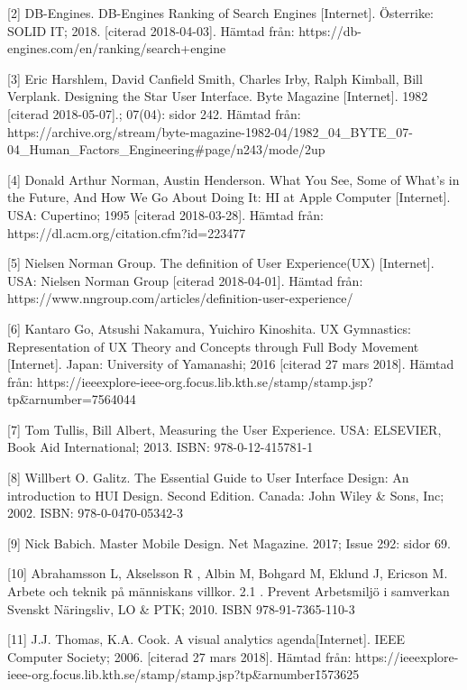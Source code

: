 \documentclass[12pt]{kththesis}
\begin{document}
[2] DB-Engines. DB-Engines Ranking of Search Engines [Internet]. Österrike: SOLID IT; 2018. [citerad 2018-04-03]. Hämtad från:\newline  
https://db-engines.com/en/ranking/search+engine  

[3] Eric Harshlem, David Canfield Smith, Charles Irby, Ralph Kimball, Bill Verplank. Designing the Star User Interface. Byte Magazine [Internet]. 1982  [citerad 2018-05-07].; 07(04): sidor 242. Hämtad från: \newline https://archive.org/stream/byte-magazine-1982-04/1982\_04\_BYTE\_07-04\newline\_Human\_Factors\_Engineering\#page/n243/mode/2up    
   
[4] Donald Arthur Norman, Austin Henderson. What You See, Some of What's in the Future, And How We Go About Doing It: HI at Apple Computer [Internet]. USA: Cupertino; 1995 [citerad 2018-03-28]. Hämtad från: https://dl.acm.org/citation.cfm?id=223477

[5] Nielsen Norman Group. The definition of User Experience(UX) [Internet]. USA: Nielsen Norman Group [citerad 2018-04-01]. Hämtad från:  https://www.nngroup.com/articles/definition-user-experience/        
                           
[6] Kantaro Go, Atsushi Nakamura, Yuichiro Kinoshita. UX Gymnastics: Representation of UX Theory and Concepts through Full Body Movement [Internet].  Japan: University of Yamanashi; 2016 [citerad 27 mars 2018]. Hämtad från: https://ieeexplore-ieee-org.focus.lib.kth.se\newline/stamp/stamp.jsp?tp\=\&arnumber=7564044
                                           
[7] Tom Tullis, Bill Albert, Measuring the User Experience. USA: ELSEVIER, Book Aid International; 2013. ISBN: 978-0-12-415781-1

[8] Willbert O. Galitz. The Essential Guide to User Interface Design: An introduction to HUI Design. Second Edition. Canada: John Wiley \& Sons, Inc; 2002. ISBN: 978-0-0470-05342-3

[9] Nick Babich. Master Mobile Design. Net Magazine. 2017; Issue 292: sidor 69.         

[10] Abrahamsson L, Akselsson R , Albin M,  Bohgard M, Eklund J, Ericson M. Arbete och teknik på människans villkor. 2.1 . Prevent Arbetsmiljö i samverkan Svenskt Näringsliv, LO \& PTK; 2010. ISBN 978-91-7365-110-3

[11] J.J. Thomas, K.A. Cook. A visual analytics agenda[Internet]. IEEE Computer Society; 2006. [citerad 27 mars 2018]. Hämtad från: \newline
https://ieeexplore-ieee-org.focus.lib.kth.se\newline/stamp/stamp.jsp?tp\=\&arnumber\=1573625
\end{document}
